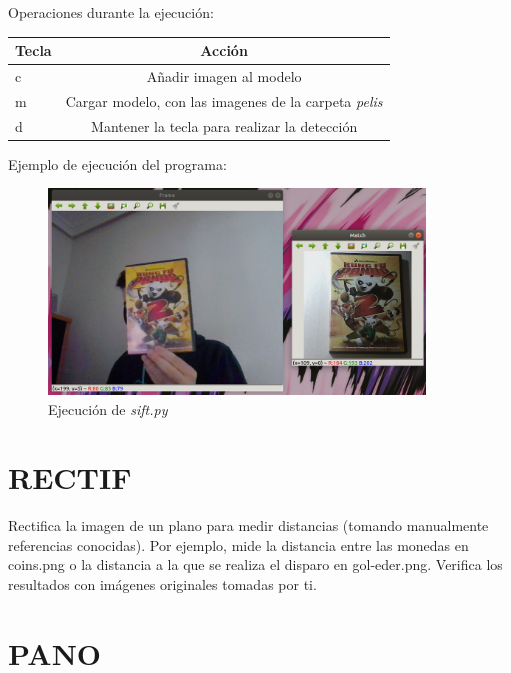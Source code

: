 \documentclass[a4paper]{article} %
\begin{document}
Operaciones durante la ejecución:

\begin{center}
    \begin{tabular}{ l | c }
      Tecla & Acción \\ \hline
      c & Añadir imagen al modelo \\
      m & Cargar modelo, con las imagenes de la carpeta \textit{pelis}\\
      d & Mantener la tecla para realizar la detección \\
    \end{tabular}
\end{center}

Ejemplo de ejecución del programa:

\begin{figure}[htp]
    \centering
    \includegraphics[width=10cm]{imagenes/sift.png}
    \caption{Ejecución de \textit{sift.py}}
    \label{fig:sift}
\end{figure}

\section{RECTIF}
\bigskip

\begin{tcolorbox}[breakable,notitle,boxrule=0pt,colback=lightgray,colframe=lightgray]
	Rectifica la imagen de un plano para medir distancias (tomando manualmente referencias conocidas). Por ejemplo, mide la distancia entre las monedas en coins.png o la distancia a la que se realiza el disparo en gol-eder.png. Verifica los resultados con imágenes originales tomadas por ti.
\end{tcolorbox}

\newpage


\section{PANO}
\bigskip
\end{document}
